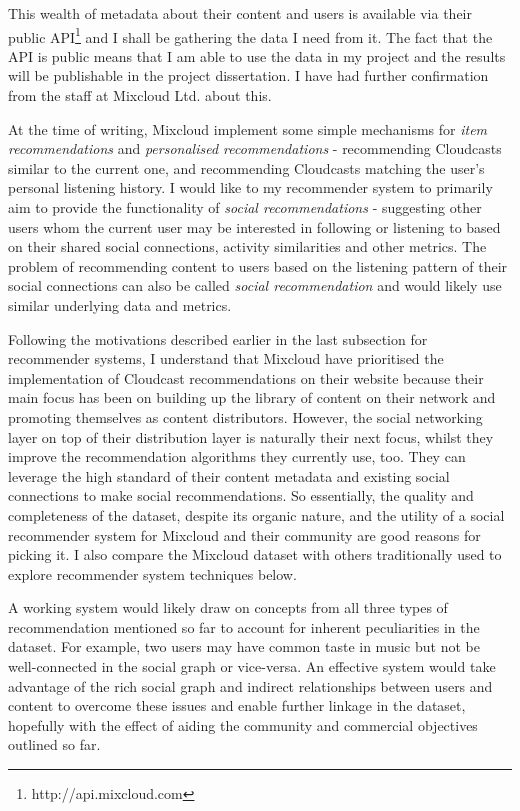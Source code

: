 This wealth of metadata about their content and users is available via their public API\footnote{http://api.mixcloud.com} and I shall be gathering the data I need from it. The fact that the API is public means that I am able to use the data in my project and the results will be publishable in the project dissertation. I have had further confirmation from the staff at Mixcloud Ltd. about this.

At the time of writing, Mixcloud implement some simple mechanisms for \emph{item recommendations} and \emph{personalised recommendations} - recommending Cloudcasts similar to the current one, and recommending Cloudcasts matching the user's personal listening history. I would like to my recommender system to primarily aim to provide the functionality of \emph{social recommendations} - suggesting other users whom the current user may be interested in following or listening to based on their shared social connections, activity similarities and other metrics. The problem of recommending content to users based on the listening pattern of their social connections can also be called \emph{social recommendation} and would likely use similar underlying data and metrics. 

Following the motivations described earlier in the last subsection for recommender systems, I understand that Mixcloud have prioritised the implementation of Cloudcast recommendations on their website because their main focus has been on building up the library of content on their network and promoting themselves as content distributors. However, the social networking layer on top of their distribution layer is naturally their next focus, whilst they improve the recommendation algorithms they currently use, too. They can leverage the high standard of their content metadata and existing social connections to make social recommendations. So essentially, the quality and completeness of the dataset, despite its organic nature, and the utility of a social recommender system for Mixcloud and their community are good reasons for picking it. I also compare the Mixcloud dataset with others traditionally used to explore recommender system techniques below.

A working system would likely draw on concepts from all three types of recommendation mentioned so far to account for inherent peculiarities in the dataset. For example, two users may have common taste in music but not be well-connected in the social graph or vice-versa. An effective system would take advantage of the rich social graph and indirect relationships between users and content to overcome these issues and enable further linkage in the dataset, hopefully with the effect of aiding the community and commercial objectives outlined so far.

